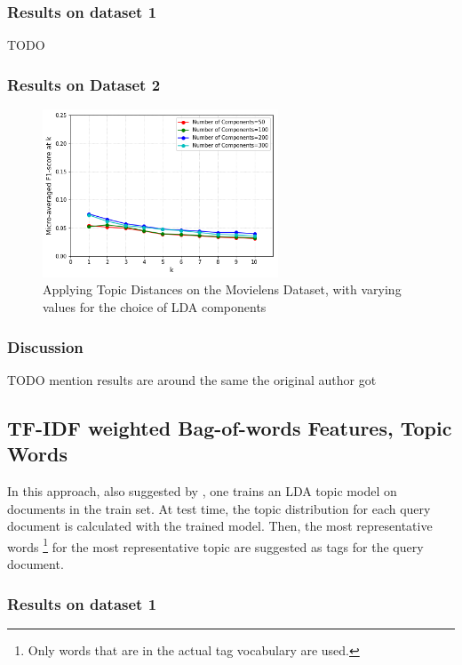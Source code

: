 \subsubsection{Results on dataset 1}

{\color{red} TODO}

\subsubsection{Results on Dataset 2}

\begin{figure}[H]
    \centering
    \includegraphics[width=7cm]{chapters/05_experiments/images/movielens-topic-distances.png}
    \caption{Applying Topic Distances on the Movielens Dataset, with varying values for the choice of LDA components}
    \label{fig:ovr_svm_movielens}
\end{figure}

\subsubsection{Discussion}

{\color{red} TODO mention results are around the same the original author got}

\subsection{TF-IDF weighted Bag-of-words Features, Topic Words}

In this approach, also suggested by \cite{choubey_2011}, one trains an LDA topic model on documents in the train set. At test time, the topic distribution for each query document is calculated with the trained model. Then, the most representative words \footnote{Only words that are in the actual tag vocabulary are used.} for the most representative topic are suggested as tags for the query document.

\subsubsection{Results on dataset 1}

